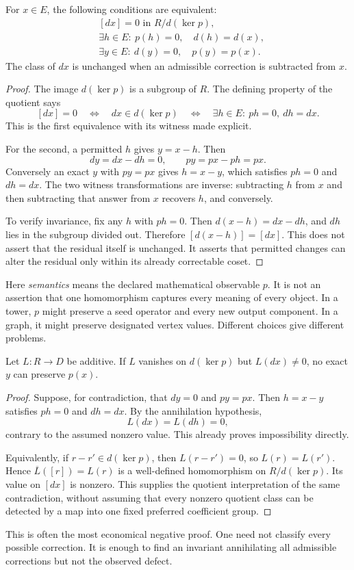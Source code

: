 \begin{theorem}\label{KS14}
For \(x\in E\), the following conditions are equivalent:
\[
\begin{aligned}
 &[dx]=0\text{ in }R/d(\ker p),\\
 &\exists h\in E:\ p(h)=0,\quad d(h)=d(x),\\
 &\exists y\in E:\ d(y)=0,\quad p(y)=p(x).
\end{aligned}
\]
The class of \(dx\) is unchanged when an admissible correction is subtracted from \(x\).
\end{theorem}
\begin{proof}
The image $d(\ker p)$ is a subgroup of $R$. The defining property of the quotient says
\[
 [dx]=0\quad\Longleftrightarrow\quad
 dx\in d(\ker p)
 \quad\Longleftrightarrow\quad
 \exists h\in E:\ ph=0,\ dh=dx.
\]
This is the first equivalence with its witness made explicit.

For the second, a permitted $h$ gives $y=x-h$. Then
\[
 dy=dx-dh=0,\qquad py=px-ph=px.
\]
Conversely an exact $y$ with $py=px$ gives $h=x-y$, which satisfies $ph=0$ and $dh=dx$. The two witness transformations are inverse: subtracting $h$ from $x$ and then subtracting that answer from $x$ recovers $h$, and conversely.

To verify invariance, fix any $h$ with $ph=0$. Then $d(x-h)=dx-dh$, and $dh$ lies in the subgroup divided out. Therefore $[d(x-h)]=[dx]$. This does not assert that the residual itself is unchanged. It asserts that permitted changes can alter the residual only within its already correctable coset.
\end{proof}
Here \emph{semantics} means the declared mathematical observable \(p\). It is not an assertion that one homomorphism captures every meaning of every object. In a tower, \(p\) might preserve a seed operator and every new output component. In a graph, it might preserve designated vertex values. Different choices give different problems.

\begin{proposition}\label{KS15}
Let \(L:R\to D\) be additive. If \(L\) vanishes on \(d(\ker p)\) but \(L(dx)\ne0\), no exact \(y\) can preserve \(p(x)\).
\end{proposition}
\begin{proof}
Suppose, for contradiction, that $dy=0$ and $py=px$. Then $h=x-y$ satisfies $ph=0$ and $dh=dx$. By the annihilation hypothesis,
\[
 L(dx)=L(dh)=0,
\]
contrary to the assumed nonzero value. This already proves impossibility directly.

Equivalently, if $r-r'\in d(\ker p)$, then $L(r-r')=0$, so $L(r)=L(r')$. Hence $\overline L([r])=L(r)$ is a well-defined homomorphism on $R/d(\ker p)$. Its value on $[dx]$ is nonzero. This supplies the quotient interpretation of the same contradiction, without assuming that every nonzero quotient class can be detected by a map into one fixed preferred coefficient group.
\end{proof}
This is often the most economical negative proof. One need not classify every possible correction. It is enough to find an invariant annihilating all admissible corrections but not the observed defect.


